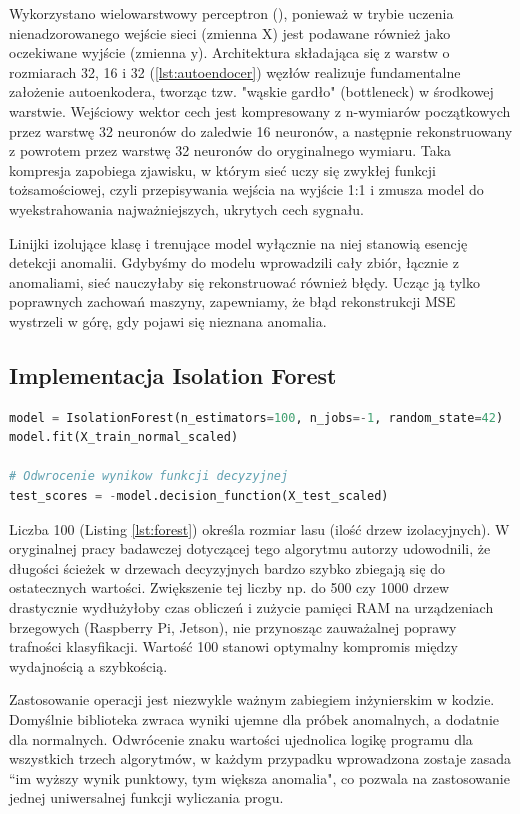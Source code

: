 \documentclass[12pt,twoside]{article}
\begin{document}
Wykorzystano wielowarstwowy perceptron (), ponieważ w trybie uczenia nienadzorowanego wejście sieci (zmienna X) jest podawane również jako oczekiwane wyjście (zmienna y). Architektura składająca się z warstw o rozmiarach 32, 16 i 32 (\ref{lst:autoendocer}) węzłów realizuje fundamentalne założenie autoenkodera, tworząc tzw. "wąskie gardło" (bottleneck) w środkowej warstwie. Wejściowy wektor cech jest kompresowany z n-wymiarów początkowych przez warstwę 32 neuronów do zaledwie 16 neuronów, a następnie rekonstruowany z powrotem przez warstwę 32 neuronów do oryginalnego wymiaru. Taka kompresja zapobiega zjawisku, w którym sieć uczy się zwykłej funkcji tożsamościowej, czyli przepisywania wejścia na wyjście 1:1 i zmusza model do wyekstrahowania najważniejszych, ukrytych cech sygnału.

Linijki izolujące klasę  i trenujące model wyłącznie na niej stanowią esencję detekcji anomalii. Gdybyśmy do modelu wprowadzili cały zbiór, łącznie z anomaliami, sieć nauczyłaby się rekonstruować również błędy. Ucząc ją tylko poprawnych zachowań maszyny, zapewniamy, że błąd rekonstrukcji MSE wystrzeli w górę, gdy pojawi się nieznana anomalia.

\subsection{Implementacja Isolation Forest}

\begin{lstlisting}[language=python, numbers=none, caption={Parametry uczenia Isolation Forest}, label={lst:forest}]
model = IsolationForest(n_estimators=100, n_jobs=-1, random_state=42)
model.fit(X_train_normal_scaled)

# Odwrocenie wynikow funkcji decyzyjnej
test_scores = -model.decision_function(X_test_scaled)
\end{lstlisting}

Liczba 100  (Listing \ref{lst:forest}) określa rozmiar lasu (ilość drzew izolacyjnych). W oryginalnej pracy badawczej dotyczącej tego algorytmu autorzy udowodnili, że długości ścieżek w drzewach decyzyjnych bardzo szybko zbiegają się do ostatecznych wartości. Zwiększenie tej liczby np. do 500 czy 1000 drzew drastycznie wydłużyłoby czas obliczeń i zużycie pamięci RAM na urządzeniach brzegowych (Raspberry Pi, Jetson), nie przynosząc zauważalnej poprawy trafności klasyfikacji. Wartość 100 stanowi optymalny kompromis między wydajnością a szybkością.

Zastosowanie operacji  jest niezwykle ważnym zabiegiem inżynierskim w kodzie. Domyślnie biblioteka  zwraca wyniki ujemne dla próbek anomalnych, a dodatnie dla normalnych. Odwrócenie znaku wartości ujednolica logikę programu dla wszystkich trzech algorytmów, w każdym przypadku wprowadzona zostaje zasada “im wyższy wynik punktowy, tym większa anomalia", co pozwala na zastosowanie jednej uniwersalnej funkcji wyliczania progu.
\end{document}
